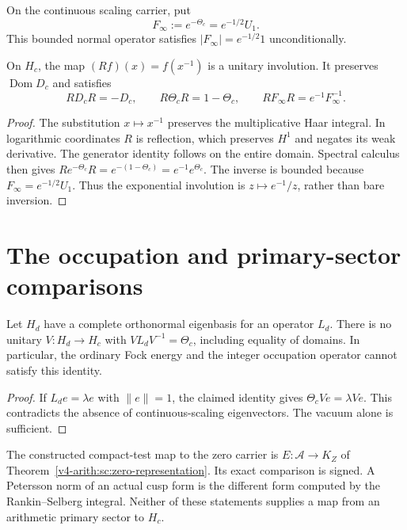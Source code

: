 \begin{definition}
\label{v4-arith:w9-r2:def:F-infty}
On the continuous scaling carrier, put
\[
 F_\infty:=e^{-\Theta_c}=e^{-1/2}U_1.
\]
This bounded normal operator satisfies
$|F_\infty|=e^{-1/2}1$ unconditionally.
\end{definition}

\begin{proposition}
\label{v4-arith:pres90:reflection}
On $H_c$, the map $(Rf)(x)=f(x^{-1})$ is a unitary involution.
It preserves $\operatorname{Dom}D_c$ and satisfies
\[
 RD_cR=-D_c,\qquad R\Theta_cR=1-\Theta_c,\qquad
 RF_\infty R=e^{-1}F_\infty^{-1}.
\]
\end{proposition}
\begin{proof}
The substitution $x\mapsto x^{-1}$ preserves the multiplicative
Haar integral. In logarithmic coordinates $R$ is reflection,
which preserves $H^1$ and negates its weak derivative.
The generator identity follows on the entire domain. Spectral
calculus then gives
$Re^{-\Theta_c}R=e^{-(1-\Theta_c)}=e^{-1}e^{\Theta_c}$.
The inverse is bounded because $F_\infty=e^{-1/2}U_1$.
Thus the exponential involution is $z\mapsto e^{-1}/z$, rather than
bare inversion.
\end{proof}

\section{The occupation and primary-sector comparisons}
\begin{theorem}
\label{v4-arith:w9-r2:lem:L0-Mellin}
Let $H_d$ have a complete orthonormal eigenbasis for an operator
$L_d$. There is no unitary $V:H_d\to H_c$ with
$VL_dV^{-1}=\Theta_c$, including equality of domains.
In particular, the ordinary Fock energy and the integer occupation
operator cannot satisfy this identity.
\end{theorem}
\begin{proof}
If $L_d e=\lambda e$ with $\|e\|=1$, the claimed identity gives
$\Theta_c Ve=\lambda Ve$. This contradicts the absence of
continuous-scaling eigenvectors. The vacuum alone is sufficient.
\end{proof}

The constructed compact-test map to the zero carrier is
$E:\mathscr A\to K_Z$ of Theorem~\ref{v4-arith:sc:zero-representation}.
Its exact comparison is signed. A Petersson norm of an actual cusp
form is the different form computed by the Rankin--Selberg integral.
Neither of these statements supplies a map from an arithmetic
primary sector to $H_c$.

